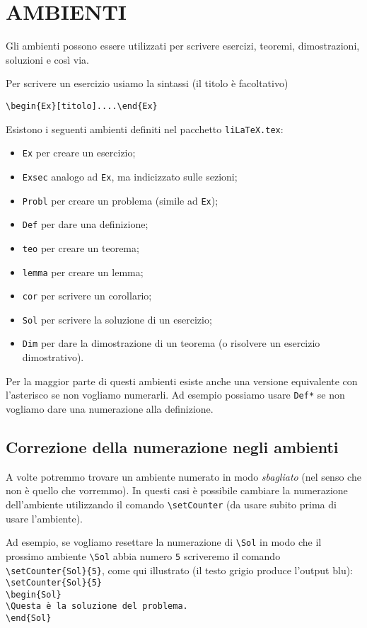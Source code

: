 \documentclass[italian, a4paper]{article}
\newcommand{\bs}{\textbackslash}
\newcommand{\ttt}[1]{\texttt{#1}}
\begin{document}
\section{AMBIENTI}
Gli ambienti possono essere utilizzati per scrivere esercizi, teoremi, dimostrazioni, soluzioni e così via.

Per scrivere un esercizio usiamo la sintassi (il titolo è facoltativo)

\ttt{\bs begin\{Ex\}[titolo]....\bs end\{Ex\}}

Esistono i seguenti ambienti definiti nel pacchetto \ttt{liLaTeX.tex}:
\begin{itemize}[nolistsep]
\item \ttt{Ex} per creare un esercizio;
\item \ttt{Exsec} analogo ad \ttt{Ex}, ma indicizzato sulle sezioni;
\item \ttt{Probl} per creare un problema (simile ad \ttt{Ex});
\item \ttt{Def} per dare una definizione;
\item \ttt{teo} per creare un teorema;
\item \ttt{lemma} per creare un lemma;
\item \ttt{cor} per scrivere un corollario;
\item \ttt{Sol} per scrivere la soluzione di un esercizio;
\item \ttt{Dim} per dare la dimostrazione di un teorema (o risolvere un esercizio dimostrativo).
\end{itemize}

Per la maggior parte di questi ambienti esiste anche una versione equivalente con l'asterisco se non vogliamo numerarli. Ad esempio possiamo usare \ttt{Def*} se non vogliamo dare una numerazione alla definizione.

\subsection{Correzione della numerazione negli ambienti}
A volte potremmo trovare un ambiente numerato in modo \textit{sbagliato} (nel senso che non è quello che vorremmo). In questi casi è possibile cambiare la numerazione dell'ambiente utilizzando il comando \ttt{\bs setCounter} (da usare subito prima di usare l'ambiente).

Ad esempio, se vogliamo resettare la numerazione di \ttt{\bs Sol} in modo che il prossimo ambiente \ttt{\bs Sol} abbia numero \ttt{5} scriveremo il comando \ttt{\bs setCounter\{Sol\}\{5\}}, come qui illustrato (il testo grigio produce l'output blu):\color{gray}\\
\ttt{\bs setCounter\{Sol\}\{5\}}\\
\ttt{\bs begin\{Sol\}}\\
\ttt{\bs Questa è la soluzione del problema.}\\
\ttt{\bs end\{Sol\}}
\end{document}
